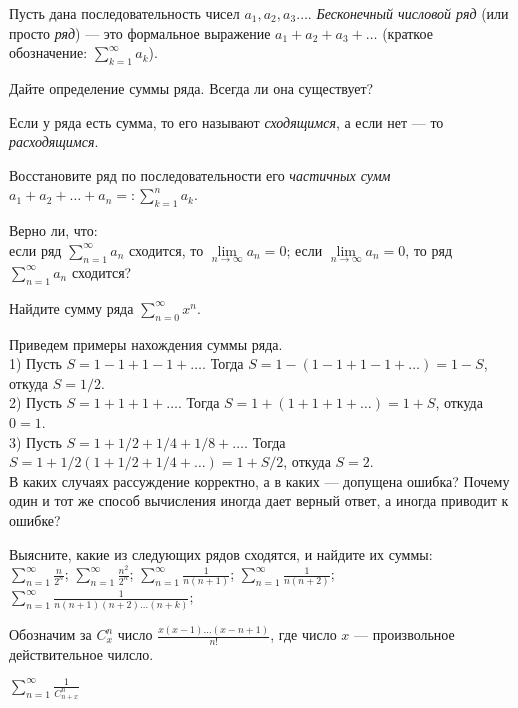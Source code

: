 \documentclass[a4paper, 12pt]{article}
\newcommand{\0}[1]{\overline{#1}}
\begin{document}


Пусть дана последовательность чисел $a_1,a_2,a_3\dots$. {\it Бесконечный числовой ряд}
(или просто {\it ряд}) --- это формальное выражение $a_1+a_2+a_3+\dots$
(краткое обозначение: $\sum\limits_{k=1}^{\infty} a_k$).

Дайте определение суммы ряда. Всегда ли она существует?

Если у ряда есть сумма, то его называют {\it сходящимся}, а если нет --- то {\it расходящимся}.

Восстановите ряд по последовательности его {\it частичных сумм}
$a_1+a_2+\dots+a_n=:\sum\limits_{k=1}^n a_k$.

Верно ли, что:
\\
если ряд $\sum\limits_{n=1}^{\infty} a_n$ сходится, то $\lim\limits_{n\to\infty} a_n=0$;
если $\lim\limits_{n\to\infty} a_n=0$, то ряд $\sum\limits_{n=1}^{\infty} a_n$ сходится?

Найдите сумму ряда $\sum\limits_{n=0}^{\infty} x^n$.

 Приведем примеры нахождения суммы ряда.
\\
1) Пусть $S=1-1+1-1+\dots$. Тогда $S=1-(1-1+1-1+\dots)=1-S$, откуда $S=1/2$.
\\
2) Пусть $S=1+1+1+\dots$. Тогда $S=1+(1+1+1+\dots)=1+S$, откуда $0=1$.
\\
3) Пусть $S=1+1/2+1/4+1/8+\dots$. Тогда $S=1+1/2(1+1/2+1/4+\dots)=1+S/2$,
откуда $S=2$.
\\
В каких случаях рассуждение корректно, а в каких --- допущена ошибка?
Почему один и тот же способ вычисления иногда дает верный ответ,
а иногда приводит к ошибке?

Выясните, какие из следующих рядов сходятся, и найдите их суммы:\\
$\sum\limits_{n=1}^\infty \frac{n}{2^n}$;
$\sum\limits_{n=1}^\infty \frac{n^2}{2^n}$;
$\sum\limits_{n=1}^{\infty} \frac1{n(n+1)}$;
$\sum\limits_{n=1}^{\infty} \frac1{n(n+2)}$;
$\sum\limits_{n=1}^{\infty} \frac1{n(n+1)(n+2)\dots(n+k)}$;

 Обозначим за $C_x^n$ число $\frac{x(x-1)\dots(x-n+1)}{n!}$, где число $x$ --- произвольное действительное чилсло.

$\sum\limits_{n=1}^{\infty}\frac1{C_{n+x}^n}$
\end{document}
